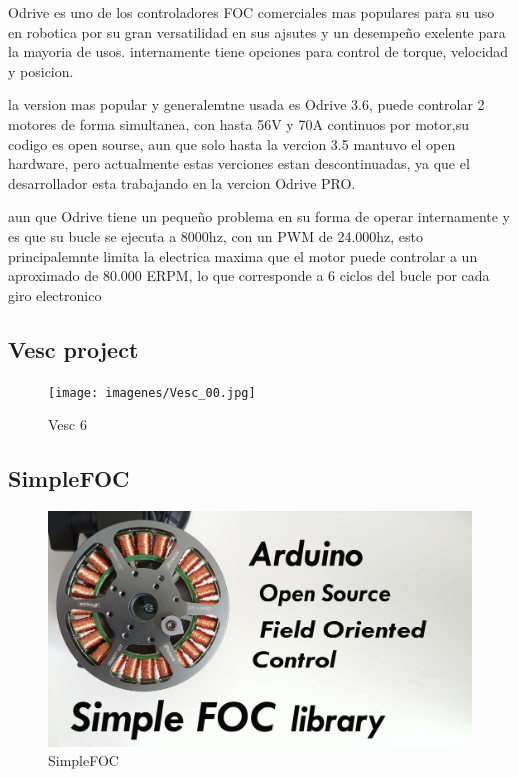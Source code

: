 \documentclass[11pt]{report}
\begin{document}
Odrive es uno de los controladores FOC comerciales mas populares para su uso en robotica por su gran versatilidad en sus ajsutes y un desempeño exelente para la mayoria de usos. internamente tiene opciones para control de torque, velocidad y posicion.

la version mas popular y generalemtne usada es Odrive 3.6, puede controlar 2 motores de forma simultanea, con hasta 56V y 70A continuos por motor,su codigo es open sourse, aun que solo hasta la vercion 3.5 mantuvo el open hardware, pero actualmente estas verciones estan descontinuadas, ya que el desarrollador esta trabajando en la vercion Odrive PRO.

aun que Odrive tiene un pequeño problema en su forma de operar internamente y es que su bucle se ejecuta a 8000hz, con un PWM de 24.000hz, esto principalemnte limita la electrica maxima que el motor puede controlar a un aproximado de 80.000 ERPM, lo que corresponde a 6 ciclos del bucle por cada giro electronico

\subsection{Vesc project}
\begin{figure}[ht]
	\centering
	\texttt{[image: imagenes/Vesc\_00.jpg]}
	\caption{Vesc 6}
\end{figure}
\FloatBarrier


\subsection{SimpleFOC}
\begin{figure}[ht]
	\centering
	\includegraphics[scale=0.05]{imagenes/simpleFOC.jpeg}
	\caption{SimpleFOC}
\end{figure}
\FloatBarrier
\end{document}
